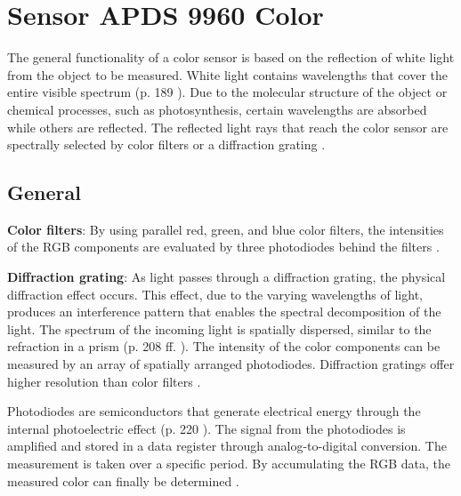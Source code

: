 %
%

\chapter{Sensor APDS 9960 Color}



The general functionality of a color sensor is based on the reflection of white light from the object to be measured. White light contains wavelengths that cover the entire visible spectrum (p. 189 \cite{Rybach:2013}). Due to the molecular structure of the object or chemical processes, such as photosynthesis, certain wavelengths are absorbed while others are reflected. The reflected light rays that reach the color sensor are spectrally selected by color filters or a diffraction grating  \cite{Hering:2023}. 

\section{General}

\textbf{Color filters}: By using parallel red, green, and blue color filters, the intensities of the RGB components are evaluated by three photodiodes behind the filters \cite{Hering:2023}.

\textbf{Diffraction grating}: As light passes through a diffraction grating, the physical diffraction effect occurs. This effect, due to the varying wavelengths of light, produces an interference pattern that enables the spectral decomposition of the light. The spectrum of the incoming light is spatially dispersed, similar to the refraction in a prism (p. 208 ff. \cite{Rybach:2013}). The intensity of the color components can be measured by an array of spatially arranged photodiodes. Diffraction gratings offer higher resolution than color filters \cite{Hering:2023}.

Photodiodes are semiconductors that generate electrical energy through the internal photoelectric effect (p. 220 \cite{Rybach:2013}). The signal from the photodiodes is amplified and stored in a data register through analog-to-digital conversion. The measurement is taken over a specific period. By accumulating the RGB data, the measured color can finally be determined \cite{Avago:2015}. 


